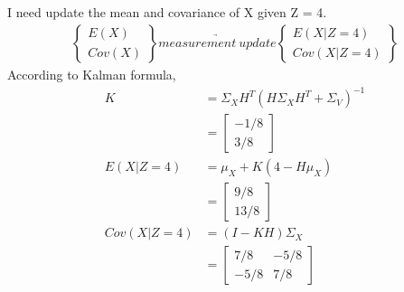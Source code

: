 \documentclass{article}
\begin{document}
\subsection{}
I need update the mean and covariance of X given Z = 4.
\begin{align*}
    \begin{Bmatrix}
        E(X)\\Cov(X)
    \end{Bmatrix}
    \underrightarrow{measurement\ update}
    \begin{Bmatrix}
        E(X|Z=4)\\Cov(X|Z=4)
    \end{Bmatrix}
\end{align*}
According to Kalman formula, 
\begin{align*}
    K&=\Sigma_XH^T(H\Sigma_XH^T+\Sigma_V)^{-1}\\
    &=
    \begin{bmatrix}
        -1/8\\3/8
    \end{bmatrix}
    \\
    E(X|Z=4)&=\mu_X+K(4-H\mu_X)\\
    &=
    \begin{bmatrix}
        9/8\\13/8
    \end{bmatrix}\\
    Cov(X|Z=4)&=(I-KH)\Sigma_X\\
    &=
    \begin{bmatrix}
        7/8&-5/8\\
        -5/8&7/8
    \end{bmatrix}
\end{align*}
\end{document}
